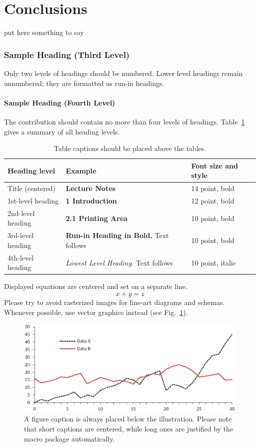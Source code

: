 \documentclass[runningheads]{llncs}
\begin{document}
\section{Conclusions}
put here something to say


%
%
%
%
%
%
\subsubsection{Sample Heading (Third Level)} Only two levels of
headings should be numbered. Lower level headings remain unnumbered;
they are formatted as run-in headings.

\paragraph{Sample Heading (Fourth Level)}
The contribution should contain no more than four levels of
headings. Table~\ref{tab1} gives a summary of all heading levels.

\begin{table}
\caption{Table captions should be placed above the
tables.}\label{tab1}
\begin{tabular}{|l|l|l|}
\hline
Heading level &  Example & Font size and style\\
\hline
Title (centered) &  {\Large\bfseries Lecture Notes} & 14 point, bold\\
1st-level heading &  {\large\bfseries 1 Introduction} & 12 point, bold\\
2nd-level heading & {\bfseries 2.1 Printing Area} & 10 point, bold\\
3rd-level heading & {\bfseries Run-in Heading in Bold.} Text follows & 10 point, bold\\
4th-level heading & {\itshape Lowest Level Heading.} Text follows & 10 point, italic\\
\hline
\end{tabular}
\end{table}


\noindent Displayed equations are centered and set on a separate
line.
\begin{equation}
x + y = z
\end{equation}
Please try to avoid rasterized images for line-art diagrams and
schemas. Whenever possible, use vector graphics instead (see
Fig.~\ref{fig1}).

\begin{figure}
\includegraphics[width=\textwidth]{fig1.eps}
\caption{A figure caption is always placed below the illustration.
Please note that short captions are centered, while long ones are
justified by the macro package automatically.} \label{fig1}
\end{figure}
\end{document}
